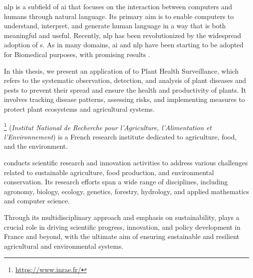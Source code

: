 \label{01_motivation}


\gls{nlp} is a subfield of \gls{ai} that focuses on the interaction between computers and humans through natural language. Its primary aim is to enable computers to understand, interpret, and generate human language in a way that is both meaningful and useful.
Recently, \gls{nlp} has been revolutionized by the widespread adoption of \neuralNetwork{}s. 
As in many domains, \gls{ai} and \gls{nlp} have been starting to be adopted for Biomedical purposes, with promising results . 



In this thesis, we present an application of \textclassification{} to Plant Health Surveillance, which refers to the systematic observation, detection, and analysis of plant diseases and pests to prevent their spread and ensure the health and productivity of plants. It involves tracking disease patterns, assessing risks, and implementing measures to protect plant ecosystems and agricultural systems.





\label{01_2_1_INRAE}

\href{https://www.inrae.fr/}{\INRAE{} }\footnote{\url{https://www.inrae.fr/}}  (\emph{Institut National de Recherche} \emph{pour l'Agriculture, l'Alimentation et l'Environnement}) is a French research institute dedicated to agriculture, food, and the environment. 

\INRAE{} conducts scientific research and innovation activities to address various challenges related to sustainable agriculture, food production, and environmental conservation. Its research efforts span a wide range of disciplines, including agronomy, biology, ecology, genetics, forestry, hydrology, and applied mathematics and computer science.

Through its multidisciplinary approach and emphasis on sustainability, \INRAE{} plays a crucial role in driving scientific progress, innovation, and policy development in France and beyond, with the ultimate aim of ensuring sustainable and resilient agricultural and environmental systems.


